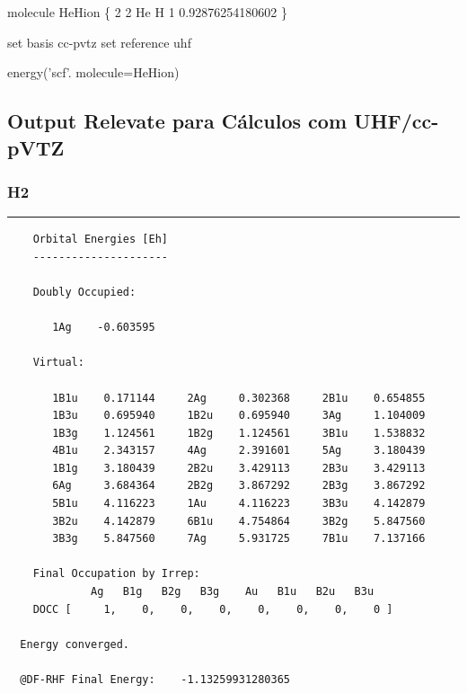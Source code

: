 \documentclass[portuguese,]{article}
\newenvironment{Shaded}{}{}
\newcommand{\BuiltInTok}[1]{#1}
\newcommand{\DecValTok}[1]{\textcolor[rgb]{0.25,0.63,0.44}{#1}}
\newcommand{\FloatTok}[1]{\textcolor[rgb]{0.25,0.63,0.44}{#1}}
\newcommand{\NormalTok}[1]{#1}
\newcommand{\OperatorTok}[1]{\textcolor[rgb]{0.40,0.40,0.40}{#1}}
\newcommand{\StringTok}[1]{\textcolor[rgb]{0.25,0.44,0.63}{#1}}
\begin{document}
\begin{Shaded}
\begin{Highlighting}[]
\NormalTok{molecule HeHion \{}
    \DecValTok{2} \DecValTok{2}
\NormalTok{    He}
\NormalTok{    H }\DecValTok{1} \FloatTok{0.92876254180602}
\NormalTok{\}}

\BuiltInTok{set}\NormalTok{ basis cc}\OperatorTok{-}\NormalTok{pvtz }
\BuiltInTok{set}\NormalTok{ reference uhf}

\NormalTok{energy(}\StringTok{'scf'}\NormalTok{. molecule}\OperatorTok{=}\NormalTok{HeHion)}
\end{Highlighting}
\end{Shaded}

\hypertarget{output-relevate-para-cuxe1lculos-com-uhfcc-pvtz}{%
\subsection{Output Relevate para Cálculos com
UHF/cc-pVTZ}\label{output-relevate-para-cuxe1lculos-com-uhfcc-pvtz}}

\label{output:ccpvtz}

\hypertarget{h2-4}{%
\subsubsection{H2}\label{h2-4}}

\begin{center}\rule{0.5\linewidth}{\linethickness}\end{center}

\begin{verbatim}
    Orbital Energies [Eh]
    ---------------------

    Doubly Occupied:                                                      

       1Ag    -0.603595  

    Virtual:                                                              

       1B1u    0.171144     2Ag     0.302368     2B1u    0.654855  
       1B3u    0.695940     1B2u    0.695940     3Ag     1.104009  
       1B3g    1.124561     1B2g    1.124561     3B1u    1.538832  
       4B1u    2.343157     4Ag     2.391601     5Ag     3.180439  
       1B1g    3.180439     2B2u    3.429113     2B3u    3.429113  
       6Ag     3.684364     2B2g    3.867292     2B3g    3.867292  
       5B1u    4.116223     1Au     4.116223     3B3u    4.142879  
       3B2u    4.142879     6B1u    4.754864     3B2g    5.847560  
       3B3g    5.847560     7Ag     5.931725     7B1u    7.137166  

    Final Occupation by Irrep:
             Ag   B1g   B2g   B3g    Au   B1u   B2u   B3u 
    DOCC [     1,    0,    0,    0,    0,    0,    0,    0 ]

  Energy converged.

  @DF-RHF Final Energy:    -1.13259931280365
\end{verbatim}
\end{document}
